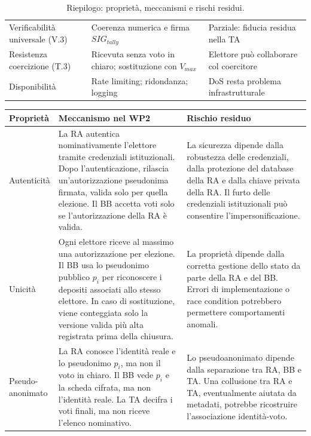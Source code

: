 \documentclass[12pt,a4paper]{article}
\begin{document}
\begin{table}[H]
{\begin{tabular}{>{\raggedright\arraybackslash}p{3.85cm} 
                >{\raggedright\arraybackslash}p{5.325cm} 
                >{\raggedright\arraybackslash}p{5.325cm}}
Verificabilità universale (V.3) &
Coerenza numerica e firma $SIG_{tally}$ &
Parziale: fiducia residua nella TA \\[6pt]

Resistenza coercizione (T.3) &
Ricevuta senza voto in chiaro; sostituzione con $V_{max}$ &
Elettore può collaborare col coercitore \\[6pt]

Disponibilità &
Rate limiting; ridondanza; logging &
DoS resta problema infrastrutturale \\
\bottomrule
\end{tabular}%
}
\caption{Riepilogo: proprietà, meccanismi e rischi residui.}
\label{tab:wp3-riepilogo}
\end{table}

\begin{small}
\begin{longtable}{>{\raggedright}p{2.5cm} p{5.5cm} p{5cm}}
\toprule
\textbf{Propriet\`a} & \textbf{Meccanismo nel WP2} & \textbf{Rischio residuo} \\
\midrule
\endhead

Autenticit\`a &
La RA autentica nominativamente l'elettore tramite credenziali istituzionali. Dopo l'autenticazione, rilascia un'autorizzazione pseudonima firmata, valida solo per quella elezione. Il BB accetta voti solo se l'autorizzazione della RA \`e valida. &
La sicurezza dipende dalla robustezza delle credenziali, dalla protezione del database della RA e dalla chiave privata della RA. Il furto delle credenziali istituzionali pu\`o consentire l'impersonificazione. \\
\midrule

Unicit\`a &
Ogni elettore riceve al massimo una autorizzazione per elezione. Il BB usa lo pseudonimo pubblico $p_i$ per riconoscere i depositi associati allo stesso elettore. In caso di sostituzione, viene conteggiata solo la versione valida pi\`u alta registrata prima della chiusura. &
La propriet\`a dipende dalla corretta gestione dello stato da parte della RA e del BB. Errori di implementazione o race condition potrebbero permettere comportamenti anomali. \\
\midrule

\shortstack[l]{Pseudo-\\anonimato} &
La RA conosce l'identit\`a reale e lo pseudonimo $p_i$, ma non il voto in chiaro. Il BB vede $p_i$ e la scheda cifrata, ma non l'identit\`a reale. La TA decifra i voti finali, ma non riceve l'elenco nominativo. &
Lo pseudoanonimato dipende dalla separazione tra RA, BB e TA. Una collusione tra RA e TA, eventualmente aiutata da metadati, potrebbe ricostruire l'associazione identit\`a-voto. \\
\midrule


\end{longtable}
\end{small}
\end{document}
